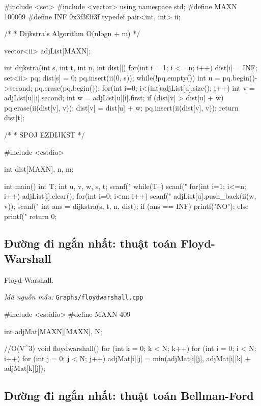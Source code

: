 \documentclass[11pt]{article}
\newcommand{\codepath}[1]{\par\noindent\textit{Mã nguồn mẫu:} \texttt{#1}\par}
\begin{document}
\begingroup\scriptsize
\begin{vncode}

#include <set>
#include <vector>
using namespace std;
#define MAXN 100009
#define INF 0x3f3f3f3f
typedef pair<int, int> ii;

/*
 * Dijkstra's Algorithm O(nlogn + m)
 */
 
vector<ii> adjList[MAXN];
 
int dijkstra(int s, int t, int n, int dist[]) {
	for(int i = 1; i <= n; i++) dist[i] = INF;
	set<ii> pq;
	dist[s] = 0;
	pq.insert(ii(0, s));
	while(!pq.empty()) {
		int u = pq.begin()->second;
		pq.erase(pq.begin());
		for(int i=0; i<(int)adjList[u].size(); i++) {
			int v = adjList[u][i].second;
			int w = adjList[u][i].first;
			if (dist[v] > dist[u] + w) {
				pq.erase(ii(dist[v], v));
				dist[v] = dist[u] + w;
				pq.insert(ii(dist[v], v));
			}
		}
	}
	return dist[t];
}

/*
 * SPOJ EZDIJKST
 */

#include <cstdio>

int dist[MAXN], n, m;
 
int main() {
	int T;
	int u, v, w, s, t;
	scanf("%
	while(T--) {
		scanf("%
		for(int i=1; i<=n; i++) adjList[i].clear();
		for(int i=0; i<m; i++) {
			scanf("%
			adjList[u].push_back(ii(w, v));
		}
		scanf("%
		int ans = dijkstra(s, t, n, dist);
		if (ans == INF) printf("NO\n");
		else printf("%
	}
	return 0;
}
\end{vncode}
\endgroup


\subsection{Đường đi ngắn nhất: thuật toán Floyd-Warshall}

Floyd-Warshall.

\codepath{Graphs/floydwarshall.cpp}

\begingroup\scriptsize
\begin{vncode}
#include <cstidio>
#define MAXN 409

int adjMat[MAXN][MAXN], N;

//O(V^3)
void floydwarshall() {
	for (int k = 0; k < N; k++)
		for (int i = 0; i < N; i++)
			for (int j = 0; j < N; j++)
				adjMat[i][j] = min(adjMat[i][j], adjMat[i][k] + adjMat[k][j]);
}
\end{vncode}
\endgroup


\subsection{Đường đi ngắn nhất: thuật toán Bellman-Ford}
\end{document}
